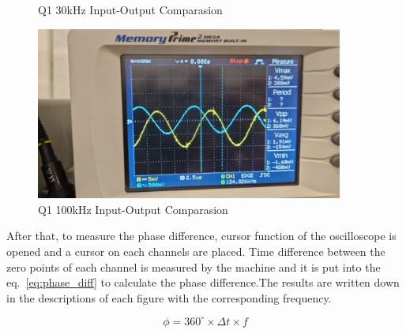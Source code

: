 \begin{figure}[h]
\begin{minipage}{0.5\textwidth}
        \caption{Q1 30kHz Input-Output Comparasion}
        \label{fig:q1-30kHz-1vpp-comp}
    \end{minipage}%
    \begin{minipage}{0.5\textwidth}
        \includegraphics[width=0.9\textwidth , height=0.2\textheight]{assets/exp/q1-100kHz-1vpp-comp.jpeg}
        \caption{Q1 100kHz Input-Output Comparasion}
        \label{fig:q1-100kHz-1vpp-comp}
    \end{minipage}
\end{figure}

After that, to measure the phase difference, cursor function of the oscilloscope is opened and a cursor on each channels are placed. Time difference between the zero points of each channel is measured by the machine and it is put into the eq.~\ref{eq:phase_diff} to calculate the phase difference.The results are written down in the descriptions of each figure with the corresponding frequency.

\begin{equation} \label{eq:phase_diff}
    \phi = 360^{\circ} \times \Delta t \times f
\end{equation}

